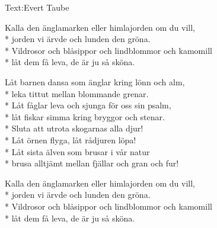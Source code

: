 \begin{SongText}[Änglamark]
    \begin{SongInfo}
        Text:Evert Taube
    \end{SongInfo}
    \begin{SongVerse}
        Kalla den änglamarken eller himlajorden om du vill,\\*%
        jorden vi ärvde och lunden den gröna.\\*%
        Vildrosor och blåsippor och lindblommor och kamomill\\*%
        låt dem få leva, de är ju så sköna.
    \end{SongVerse}
    \begin{SongVerse}
        Låt barnen dansa som änglar kring lönn och alm,\\*%
        leka tittut mellan blommande grenar.\\*%
        Låt fåglar leva och sjunga för oss sin psalm,\\*%
        låt fiskar simma kring bryggor och stenar.\\*%
        Sluta att utrota skogarnas alla djur!\\*%
        Låt örnen flyga, låt rådjuren löpa!\\*%
        Låt sista älven som brusar i vår natur\\*%
        brusa alltjämt mellan fjällar och gran och fur!
    \end{SongVerse}
    \begin{SongVerse}
        Kalla den änglamarken eller himlajorden om du vill,\\*%
        jorden vi ärvde och lunden den gröna.\\*%
        Vildrosor och blåsippor och lindblommor och kamomill\\*%
        låt dem få leva, de är ju så sköna.
    \end{SongVerse}
\end{SongText}